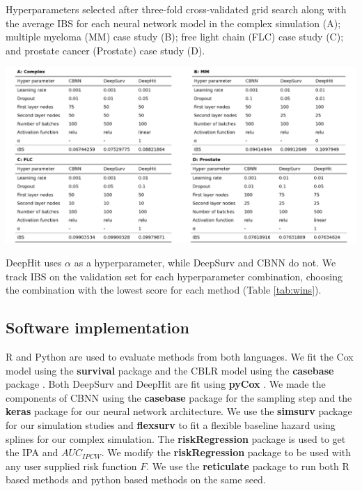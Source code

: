 \documentclass[APA,LATO1COL]{WileyNJD-v2}
\begin{document}
\begin{table}
\caption{Hyperparameters selected after three-fold cross-validated grid search along with the average IBS for each neural network model in the
complex simulation (A); multiple myeloma (MM) case study (B); free light chain (FLC) case study (C); and prostate cancer (Prostate) case study (D).}
\label{tab:wins}
\begin{center}\includegraphics[width=1\linewidth]{../figures/Table1.pdf} \end{center}
\end{table}

DeepHit uses $\alpha$ as a hyperparameter, while DeepSurv and CBNN do not. We track IBS on the validation set for each hyperparameter combination,
choosing the combination with the lowest score for each method (Table \ref{tab:wins}).

\hypertarget{software-implementation}{%
\subsection{Software implementation}\label{software-implementation}}

R \citep{Rsoft} and Python \citep{py} are used to evaluate methods from both languages. We fit the Cox model using the \textbf{survival} package
\citep{survpkg} and the CBLR model using the \textbf{casebase} package \citep{cbpkg}. Both DeepSurv and DeepHit are fit using \textbf{pyCox}
\citep{lee2018DeepHit}. We made the components of CBNN using the \textbf{casebase} package \citep{cbpkg} for the sampling step and the
\textbf{keras} \citep{keras} package for our neural network architecture. We use the \textbf{simsurv} package \citep{simsurv} for our simulation studies
and \textbf{flexsurv} \citep{flexsurv} to fit a flexible baseline hazard using splines for our complex simulation. The \textbf{riskRegression} package
\citep{riskRegression} is used to get the IPA and $AUC_{IPCW}$. We modify the \textbf{riskRegression} package to be used with any user supplied
risk function \(F\). We use the \textbf{reticulate} package \citep{reticulate} to run both R based methods and python based methods on the same seed.
\end{document}
